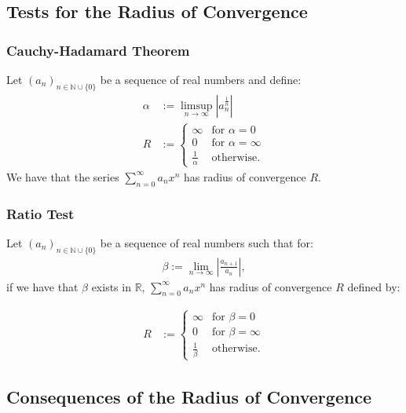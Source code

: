 \documentclass[a4paper, 12pt, twoside]{article}
\begin{document}
\newpage

\subsection{Tests for the Radius of Convergence}

\subsubsection{Cauchy-Hadamard Theorem}

Let $(a_n)_{n\in\mathbb{N}\cup\{0\}}$ be a sequence of real numbers and define:
\begin{align*}
      \alpha & := \limsup_{n\to\infty}|a_n^{\frac{1}{n}}| \\
      R      & := \begin{cases}
            \infty           & \text{for } \alpha = 0      \\
            0                & \text{for } \alpha = \infty \\
            \frac{1}{\alpha} & \text{otherwise}.
      \end{cases}
\end{align*}
We have that the series $\sum_{n = 0}^\infty a_nx^n$ has radius of convergence $R$.

\subsubsection{Ratio Test}

Let $(a_n)_{n\in\mathbb{N}\cup\{0\}}$ be a sequence of real numbers such that for:
\begin{align*}
      \beta := \lim_{n\to\infty}\left|\frac{a_{n + 1}}{a_n}\right|,
\end{align*}
if we have that $\beta$ exists in $\mathbb{R}$, $\sum_{n = 0}^\infty a_nx^n$
has radius of convergence $R$ defined by:

\begin{align*}
      R & := \begin{cases}
            \infty           & \text{for } \beta = 0      \\
            0                & \text{for } \beta = \infty \\
            \frac{1}{\beta} & \text{otherwise}.
      \end{cases}
\end{align*}

\subsection{Consequences of the Radius of Convergence}
\end{document}
